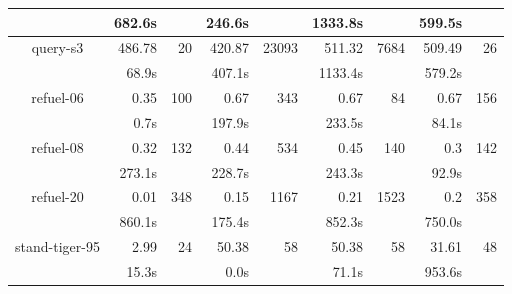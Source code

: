 \documentclass{article}
\begin{document}
\begin{table}
\begin{tabular}{|c|rr|rr|rr|rr|}
 & 682.6s & & 246.6s & & 1333.8s & & 599.5s & \\
\hline
query-s3 & 486.78 & 20 & 420.87 & 23093 & 511.32 & 7684 & 509.49 & 26 \\
 & 68.9s & & 407.1s & & 1133.4s & & 579.2s & \\
\hline
refuel-06 & 0.35 & 100 & 0.67 & 343 & 0.67 & 84 & 0.67 & 156 \\
 & 0.7s & & 197.9s & & 233.5s & & 84.1s & \\
\hline
refuel-08 & 0.32 & 132 & 0.44 & 534 & 0.45 & 140 & 0.3 & 142 \\
 & 273.1s & & 228.7s & & 243.3s & & 92.9s & \\
\hline
refuel-20 & 0.01 & 348 & 0.15 & 1167 & 0.21 & 1523 & 0.2 & 358 \\
 & 860.1s & & 175.4s & & 852.3s & & 750.0s & \\
\hline
stand-tiger-95 & 2.99 & 24 & 50.38 & 58 & 50.38 & 58 & 31.61 & 48 \\
 & 15.3s & & 0.0s & & 71.1s & & 953.6s & \\
\hline
\end{tabular}
\end{table}
\end{document}
